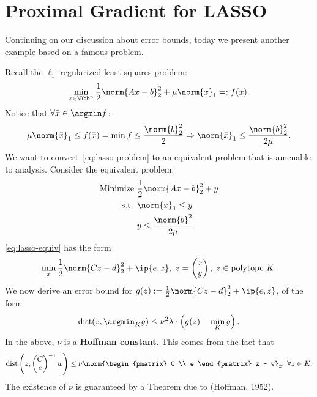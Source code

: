 \section{Proximal Gradient for LASSO}
Continuing on our discussion about error bounds, today we present another
example based on a famous problem.

Recall the $\ell_1$-regularized least squares problem:
\begin{equation}
	\min_{x \in \Rbb^n} \frac{1}{2} \norm{Ax - b}_2^2 + \mu \norm{x}_1
	=: f(x).
	\label{eq:lasso-problem}
\end{equation}
Notice that $\forall \bar{x} \in \argmin f$:
\[
	\mu \norm{\bar{x}}_1 \leq f(\bar{x})
	= \min f \leq \frac{\norm{b}^2_2}{2} \Rightarrow
	\norm{\bar{x}}_1 \leq \frac{\norm{b}_2^2}{2 \mu}.
\]
We want to convert~\cref{eq:lasso-problem} to an equivalent problem that is
amenable to analysis. Consider the equivalent problem:
\begin{align}
	\begin{aligned}
	\mbox{Minimize } & \frac{1}{2} \norm{Ax - b}_2^2 + y \\
	\mbox{s.t. } & \norm{x}_1 \leq y \\
				 & y \leq \frac{\norm{b}^2}{2\mu}
	\end{aligned}
	\label{eq:lasso-equiv}
\end{align}
\cref{eq:lasso-equiv} has the form
\[
	\min_{x} \frac{1}{2} \norm{Cz - d}_2^2 + \ip{e, z}, \;
	z = \begin{pmatrix} x \\ y \end{pmatrix}, \;
	z \in \text{polytope } K.
\]
We now derive an error bound for $g(z) := \frac{1}{2} \norm{Cz - d}_2^2 +
\ip{e, z}$, of the form
\[
	\mathrm{dist}(z, \argmin_K g) \leq
	\nu^2 \lambda \cdot \left( g(z) - \min_{K} g \right).
\]
In the above, $\nu$ is a \textbf{Hoffman constant}. This comes from the fact
that
\[
	\mathrm{dist}\left(z, \begin{pmatrix} C \\ e \end{pmatrix}^{-1} w \right)
	\leq \nu \norm{\begin{pmatrix} C \\ e \end{pmatrix} z - w}_2, \;
	\forall z \in K.
\]
The existence of $\nu$ is guaranteed by a Theorem due to (Hoffman, 1952).

